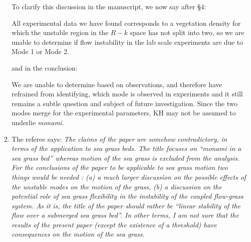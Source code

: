 \documentclass[letterpaper,10pt]{article}
\newcommand{\Rey}{{R}}
\newcommand{\monami}{\textit{monami}}
\newcommand{\revise}[1]{{\color{blue} {#1}}}
\begin{document}
\begin{enumerate}
To clarify this discussion in the manuscript, we now say after \S 4:

\noindent
\revise{All experimental data we have found corresponds to a vegetation density for which the unstable region in the $\Rey-k$ space has not split into two, so we are unable to determine if flow instability in the lab scale experiments \citep{Ghisal02} are due to Mode 1 or Mode 2.}

and in the conclusion:

\noindent
\revise{
We are unable to determine based on observations, and therefore have refrained from identifying, which mode is observed in experiments and it still remains a subtle question and subject of future investigation. Since the two modes merge for the experimental parameters, KH may not be assumed to underlie \monami.
}

\item The referee says:
\textit{
The claims of the paper are somehow contradictory, in terms of the application to sea grass beds. The title focuses on “monami in a sea grass bed” whereas motion of the sea grass is excluded from the analysis.  For the conclusions of the paper to be applicable to sea grass motion two things would be needed : (a) a much larger discussion on the possible effects of the unstable modes on the motion of the grass, (b) a discussion on the potential role of sea grass flexibility in the instability of the coupled flow-grass system. As it is, the  title of the paper should rather  be “linear stability of the flow over a submerged sea grass bed”. In other terms, I am not sure that the results of the present paper (except the existence of a threshold) have consequences on the motion of the sea grass.
}


\end{enumerate}
\end{document}
